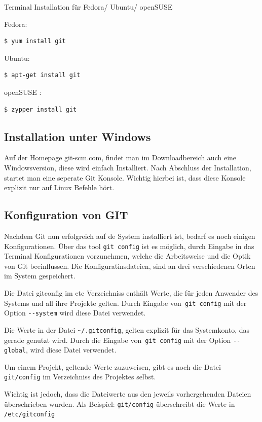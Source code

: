 \documentclass[12pt,a4paper,bibliography=totocnumbered,listof=totocnumbered]{scrartcl}
\begin{document}
Terminal Installation für Fedora/ Ubuntu/ openSUSE 

Fedora:
\begin{lstlisting}
$ yum install git
 \end{lstlisting}

Ubuntu:
\begin{lstlisting}
$ apt-get install git
 \end{lstlisting}

openSUSE :
\begin{lstlisting}
$ zypper install git
 \end{lstlisting}



\subsection{Installation unter Windows}
Auf der Homepage git-scm.com, findet man im Downloadbereich auch eine Windowsversion,
diese wird einfach Installiert. Nach Abschluss der Installation, startet man eine seperate Git Konsole. Wichtig hierbei ist, dass diese Konsole explizit nur auf Linux Befehle hört. 

\subsection{Konfiguration von GIT}
Nachdem Git nun erfolgreich auf de System installiert ist, bedarf es noch einigen Konfigurationen. Über das tool \lstinline|git config| ist es möglich, durch Eingabe in das Terminal Konfigurationen vorzunehmen, welche die Arbeitsweise und die Optik von Git beeinflussen. Die Konfiguratinsdateien, sind an drei verschiedenen Orten im System
gespeichert. 
\begin{compactitem}
	\item Die Datei gitconfig im etc Verzeichniss enthält Werte, die für jeden Anwender des Systems und all ihre Projekte gelten. Durch Eingabe von\lstinline| git config| mit der Option \lstinline|--system| wird diese Datei verwendet.
\item Die Werte in der Datei \lstinline|~/.gitconfig|, gelten explizit für das Systemkonto, das gerade genutzt wird. Durch die Eingabe von\lstinline| git config| mit der Option \lstinline|--global|, wird diese Datei verwendet. 
\item Um einem Projekt, geltende Werte zuzuweisen, gibt es noch die Datei \lstinline|git/config| im Verzeichniss des Projektes selbst. 
\end{compactitem}
Wichtig ist jedoch, dass die Dateiwerte aus den jeweils vorhergehenden Dateien überschrieben wurden. Als Beispiel: \lstinline|git/config| überschreibt die Werte in \lstinline|/etc/gitconfig|
\end{document}
